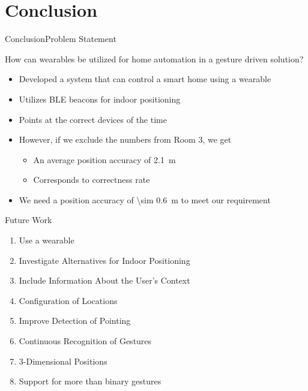 \section{Conclusion}
\begin{frame}{Conclusion}{Problem Statement}
  \begin{framed}
    How can wearables be utilized for home automation in a gesture driven solution?
  \end{framed}
  
  \begin{itemize}
    \item<2-> Developed a system that can control a smart home using a wearable
    \item<2-> Utilizes BLE beacons for indoor positioning
    \item<2-> Points at the correct devices  of the time
    \item<2-> However, if we exclude the numbers from Room 3, we get
    \begin{itemize}
      \item<2-> An average position accuracy of \SI{2.1}{\meter}
      \item<2-> Corresponds to  correctness rate
    \end{itemize}
    \item<2-> We need a position accuracy of \SI{\sim 0.6}{\meter} to meet our requirement
  \end{itemize}
\end{frame}

\begin{frame}{Future Work}
  \begin{enumerate}
    \item Use a wearable
    \item Investigate Alternatives for Indoor Positioning 
    \item Include Information About the User's Context
    \item Configuration of Locations
    \item Improve Detection of Pointing
    \item Continuous Recognition of Gestures
    \item 3-Dimensional Positions
    \item Support for more than binary gestures
  \end{enumerate}
\end{frame}
